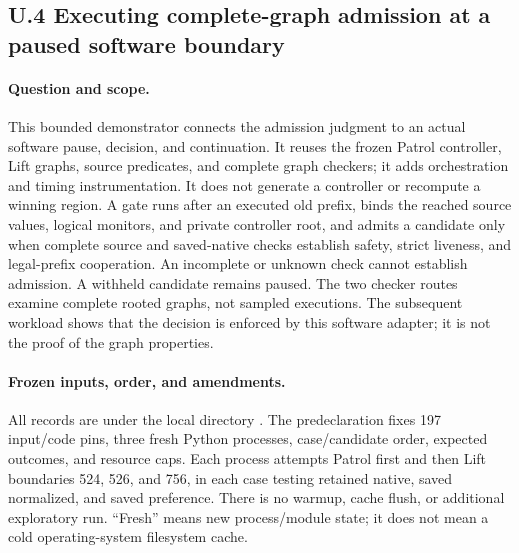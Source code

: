 \subsection*{U.4 Executing complete-graph admission at a paused software boundary}
\label{supp:runtime-admission}

\paragraph{Question and scope.}
This bounded demonstrator connects the admission judgment to an actual
software pause, decision, and continuation. It reuses the frozen Patrol
controller, Lift graphs, source predicates, and complete graph checkers;
it adds orchestration and timing instrumentation. It does not generate a
controller or recompute a winning region. A gate runs after an executed
old prefix, binds the reached source values, logical monitors, and
private controller root, and admits a candidate only when complete
source and saved-native checks establish safety, strict liveness, and
legal-prefix cooperation. An incomplete or unknown check cannot
establish admission. A withheld candidate remains paused.
The two checker routes examine complete rooted graphs, not sampled
executions. The subsequent workload shows that the decision is enforced
by this software adapter; it is not the proof of the graph properties.

\paragraph{Frozen inputs, order, and amendments.}
All records are under the local directory
.
The predeclaration fixes 197 input/code pins, three fresh Python
processes, case/candidate order, expected outcomes, and resource caps.
Each process attempts Patrol first and then Lift boundaries 524, 526,
and 756, in each case testing retained native, saved normalized, and
saved preference. There is no warmup, cache flush, or additional
exploratory run. ``Fresh'' means new process/module state; it does not
mean a cold operating-system filesystem cache.

